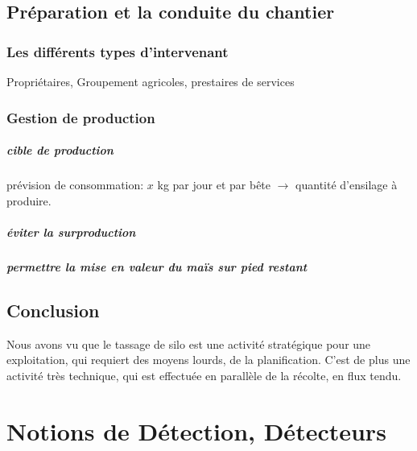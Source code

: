 \documentclass[12pt,a4paper]{report}
\begin{document}
\section{Préparation et la conduite du chantier}

\subsection{Les différents types d'intervenant}
Propriétaires, Groupement agricoles, prestaires de services

\subsection{Gestion de production}
\paragraph{cible de production} prévision de consommation: $x$ kg par jour et par bête $\rightarrow$ quantité d'ensilage à produire.

\paragraph{éviter la surproduction}

\paragraph{permettre la mise en valeur du maïs sur pied restant}




\section{Conclusion}
Nous avons vu que le tassage de silo est une activité stratégique pour une exploitation, qui requiert des moyens lourds, de la planification. C'est de plus une activité très technique, qui est effectuée en parallèle de la récolte, en flux tendu.

\paragraph{}



\chapter{Notions de Détection, Détecteurs}
\end{document}
